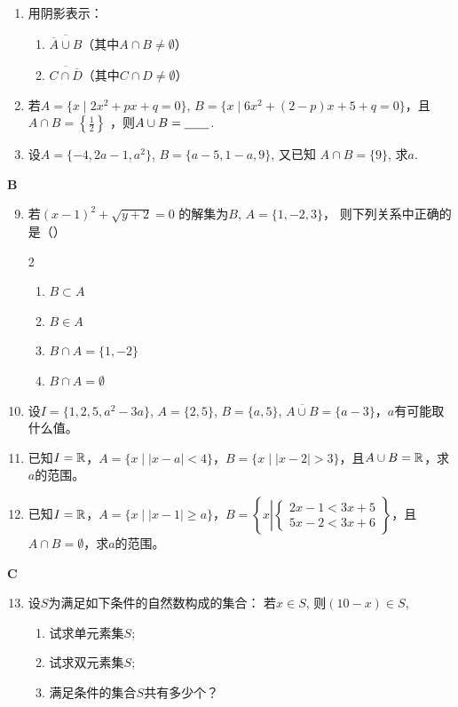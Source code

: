 \begin{enumerate}
\item 用阴影表示：
\begin{enumerate}[(1)]
    \item $\overline{\overline{A}\cup B}$（其中$A\cap B\ne \emptyset$）
    \item $\overline{C\cap \overline{D}}$（其中$C\cap D\ne \emptyset$）
\end{enumerate}

\item 若$A=\{x\mid 2x^{2}+px+q=0\}$, $B=\{x\mid 6x^{2}+\left(2-p\right)x+5+q=0\}$，且$A \cap B=\left\{\frac{1}{2}\right\}$
，则$A\cup B=\underline{\qquad}$.
\item 设$A=\{-4, 2a-1,a^{2}\}$, $B=\{a-5,1-a,9\}$, 又已知
    $A\cap B=\{9\}$, 求$a$.
\end{enumerate}

\begin{center}
\bfseries B
\end{center}

\begin{enumerate}\setcounter{enumi}{8}
    \item 若$(x-1)^2+\sqrt{y+2}=0$
    的解集为$B$, $A=\{1,-2,3\}$，    则下列关系中正确的是（\qquad ）
\begin{multicols}{2}
   \begin{enumerate}[(1)]
    \item $B\subset A$
    \item $B\in A$
    \item $B\cap A=\{1,-2\}$
    \item $B\cap A=\emptyset$
   \end{enumerate} 
\end{multicols}

\item 设$I=\{1,2,5,a^2-3a\}$, $A=\{2,5\}$, $B=\{a,5\}$, $\overline{A\cup B}=\{a-3\}$，$a$有可能取什么值。

\item 已知$I=\mathbb{R}$，$A=\{x\mid |x-a|<4\}$，$B=\{x\mid |x-2|>3\}$，且$A\cup B=\mathbb{R}$，求$a$的范围。
\item 已知$I=\mathbb{R}$，$A=\{x\mid |x-1|\ge a\}$，$B=\left\{x\left|\begin{cases}
    2x-1<3x+5\\ 5x-2<3x+6
\end{cases}\right.\right\}$，且$A\cap B=\emptyset$，求$a$的范围。

\end{enumerate}


\begin{center}
    \bfseries C
\end{center}

\begin{enumerate}\setcounter{enumi}{12}
    \item 设$S$为满足如下条件的自然数构成的集合：
    若$x\in S$, 则$(10-x)\in S$,
\begin{enumerate}[(1)]
\item 试求单元素集$S$;
\item 试求双元素集$S$;
\item 满足条件的集合$S$共有多少个？
\end{enumerate}

\end{enumerate}

